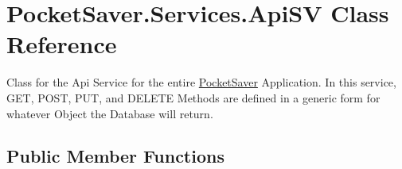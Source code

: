 \hypertarget{class_pocket_saver_1_1_services_1_1_api_s_v}{}\section{Pocket\+Saver.\+Services.\+Api\+SV Class Reference}
\label{class_pocket_saver_1_1_services_1_1_api_s_v}


Class for the Api Service for the entire \hyperlink{namespace_pocket_saver}{Pocket\+Saver} Application. In this service, G\+ET, P\+O\+ST, P\+UT, and D\+E\+L\+E\+TE Methods are defined in a generic form for whatever Object the Database will return.  


\subsection*{Public Member Functions}
